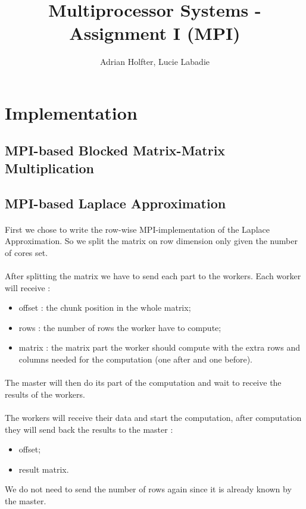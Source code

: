 \documentclass[]{article}
\title{Multiprocessor Systems - Assignment I (MPI)}
\author{Adrian Holfter, Lucie Labadie}
\begin{document}
\maketitle

\section{Implementation}

\subsection{MPI-based Blocked Matrix-Matrix Multiplication}

\subsection{MPI-based Laplace Approximation}

\paragraph{} First we chose to write the row-wise MPI-implementation of the Laplace Approximation. So we split the matrix on row dimension only given the number of cores set.
\paragraph{} After splitting the matrix we have to send each part to the workers. Each worker will receive : 
\begin{itemize}
	\item offset : the chunk position in the whole matrix; 
	\item rows : the number of rows the worker have to compute;
	\item  matrix : the matrix part the worker should compute with the extra rows and columns needed for the computation (one after and one before). 
\end{itemize}

\paragraph{} The master will then do its part of the computation and wait to receive the results of the workers. 

\paragraph{} The workers will receive their data and start the computation, after computation they will send back the results to the master : 
\begin{itemize}
	\item offset;
	\item result matrix.
\end{itemize}
We do not need to send the number of rows again since it is already known by the master. 
\end{document}
